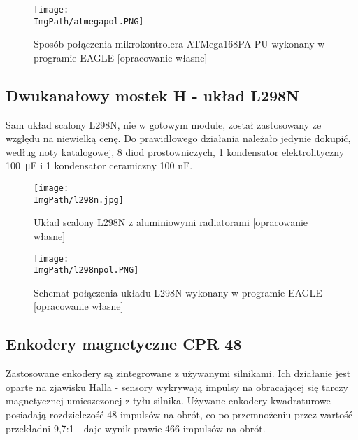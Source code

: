 \documentclass[a4paper,12pt,twoside,openany]{report}
\newcommand{\ImgPath}{.}
\begin{document}
\newpage

\begin{figure}[!htbp]
	\begin{center}
\centering
\texttt{[image: \\ImgPath/atmegapol.PNG]}
\end{center}
	\caption{Sposób połączenia mikrokontrolera ATMega168PA-PU wykonany w programie EAGLE [opracowanie własne]}
	\label{schematKomunikacji}
\end{figure}

\subsection{Dwukanałowy mostek H - układ L298N}

Sam układ scalony L298N, nie w gotowym module, został zastosowany ze względu na niewielką cenę. Do prawidłowego działania należało jedynie dokupić, według noty katalogowej, 8 diod prostowniczych, 1 kondensator elektrolityczny \SI{100}{\micro F} i 1 kondensator ceramiczny 100 nF.

\begin{figure}[!htbp]
	\begin{center}
\centering
\texttt{[image: \\ImgPath/l298n.jpg]}
\end{center}
	\caption{Układ scalony L298N z aluminiowymi radiatorami [opracowanie własne]}
	\label{schematKomunikacji}
\end{figure}

\begin{figure}[!htbp]
	\begin{center}
\centering
\texttt{[image: \\ImgPath/l298npol.PNG]}
\end{center}
	\caption{Schemat połączenia układu L298N wykonany w programie EAGLE [opracowanie własne]}
	\label{schematKomunikacji}
\end{figure}

\newpage

\subsection{Enkodery magnetyczne CPR 48}

Zastosowane enkodery są zintegrowane z używanymi silnikami. Ich działanie jest oparte na zjawisku Halla - sensory wykrywają impulsy na obracającej się tarczy magnetycznej umieszczonej z tyłu silnika. Używane enkodery kwadraturowe posiadają rozdzielczość 48 impulsów na obrót, co po przemnożeniu przez wartość przekładni 9,7:1 - daje wynik prawie 466 impulsów na obrót.
\end{document}
